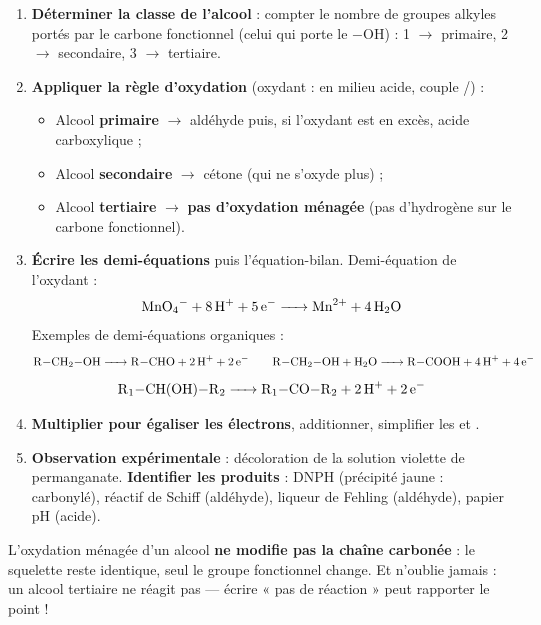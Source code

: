 \documentclass[11pt]{article}
\newcommand{\cle}[1]{{\popxbold\color{popdark}#1}}
\begin{document}
\begin{methode}
\begin{enumerate}
\item \textbf{Déterminer la classe de l'alcool} : compter le nombre de groupes alkyles portés par le carbone fonctionnel (celui qui porte le $-$OH) : 1 $\to$ primaire, 2 $\to$ secondaire, 3 $\to$ tertiaire.
\item \textbf{Appliquer la règle d'oxydation} (oxydant :  en milieu acide, couple /) :
\begin{itemize}
\item Alcool \textbf{primaire} $\to$ \cle{aldéhyde} puis, si l'oxydant est en excès, \cle{acide carboxylique} ;
\item Alcool \textbf{secondaire} $\to$ \cle{cétone} (qui ne s'oxyde plus) ;
\item Alcool \textbf{tertiaire} $\to$ \textbf{pas d'oxydation ménagée} (pas d'hydrogène sur le carbone fonctionnel).
\end{itemize}
\item \textbf{Écrire les demi-équations} puis l'équation-bilan. Demi-équation de l'oxydant :
\[ \ce{MnO4^- + 8 H^+ + 5 e^- -> Mn^2+ + 4 H2O} \]
Exemples de demi-équations organiques :
\[ \ce{R-CH2-OH -> R-CHO + 2 H^+ + 2 e^-} \qquad \ce{R-CH2-OH + H2O -> R-COOH + 4 H^+ + 4 e^-} \]
\[ \ce{R1-CH(OH)-R2 -> R1-CO-R2 + 2 H^+ + 2 e^-} \]
\item \textbf{Multiplier pour égaliser les électrons}, additionner, simplifier les  et .
\item \textbf{Observation expérimentale} : décoloration de la solution violette de permanganate. \textbf{Identifier les produits} : DNPH (précipité jaune : carbonylé), réactif de Schiff (aldéhyde), liqueur de Fehling (aldéhyde), papier pH (acide).
\end{enumerate}

\begin{attention}
L'oxydation ménagée d'un alcool \textbf{ne modifie pas la chaîne carbonée} : le squelette reste identique, seul le groupe fonctionnel change. Et n'oublie jamais : un alcool tertiaire ne réagit pas — écrire « pas de réaction » peut rapporter le point !
\end{attention}
\end{methode}
\end{document}

